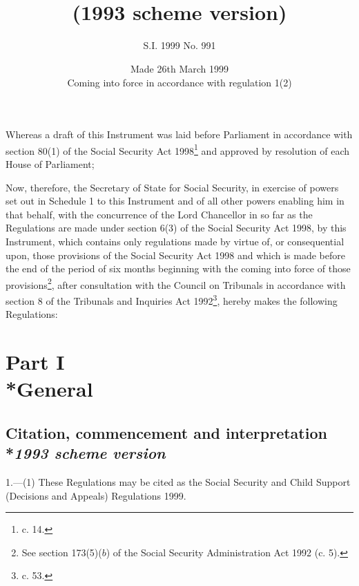\documentclass[12pt,a4paper]{article}
\title{\regstitle\\(1993 scheme version)}
\title{\regstitle}
\author{S.I. 1999 No. 991}
\date{Made 26th March 1999\\Coming into force in accordance with regulation 1(2)}
\begin{document}
\maketitle

\noindent
Whereas a draft of this Instrument was laid before Parliament in accordance with section 80(1) of the Social Security Act 1998\footnote{ c. 14.} and approved by resolution of each House of Parliament;

 Now, therefore, the Secretary of State for Social Security, in exercise of powers set out in Schedule 1 to this Instrument and of all other powers enabling him in that behalf, with the concurrence of the Lord Chancellor in so far as the Regulations are made under section 6(3) of the Social Security Act 1998, by this Instrument, which contains only regulations made by virtue of, or consequential upon, those provisions of the Social Security Act 1998 and which is made before the end of the period of six months beginning with the coming into force of those provisions\footnote{\frenchspacing See section 173(5)($b$) of the Social Security Administration Act 1992 (c. 5).}, after consultation with the Council on Tribunals in accordance with section 8 of the Tribunals and Inquiries Act 1992\footnote{ c. 53.}, hereby makes the following Regulations:

{\sloppy

\tableofcontents

}

\bigskip

\setcounter{secnumdepth}{-2}

\section[Part I --- General]{Part I\\*General}

\renewcommand\parthead{--- Part I}

\subsection[1. Citation, commencement and interpretation --- \emph{1993 scheme version}]{Citation, commencement and interpretation\\*\emph{1993 scheme version}}

1.—(1) These Regulations may be cited as the Social Security and Child Support (Decisions and Appeals) Regulations 1999.
\end{document}
